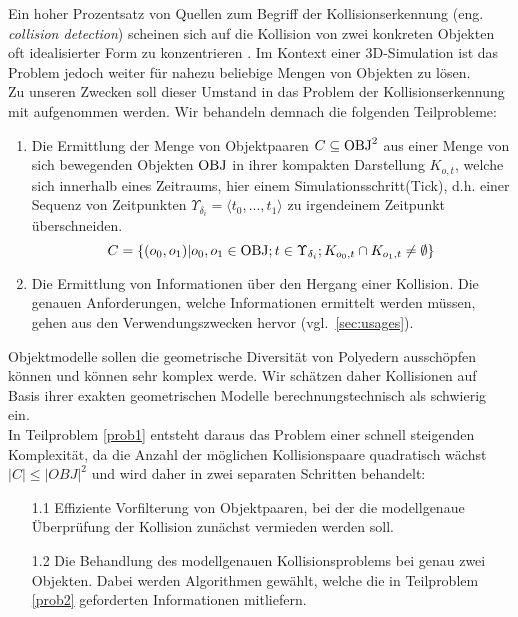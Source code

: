 \label{ref:problem_def}
Ein hoher Prozentsatz von Quellen zum Begriff der Kollisionserkennung (eng. \textit{collision detection}) scheinen sich auf die Kollision von zwei konkreten Objekten oft idealisierter Form zu konzentrieren \cites[ch.12]{fourcrossfour}{gjk}{gdc-physics}.
Im Kontext einer 3D-Simulation ist das Problem jedoch weiter für nahezu beliebige Mengen von Objekten zu lösen.\\
Zu unseren Zwecken soll dieser Umstand in das Problem der Kollisionserkennung mit aufgenommen werden. Wir behandeln demnach die folgenden Teilprobleme:
\begin{enumerate}
\item \label{prob1}Die Ermittlung der Menge von Objektpaaren $C \subseteq \operatorname{OBJ}^2$ aus einer Menge von sich bewegenden Objekten $\operatorname{OBJ}$ in ihrer kompakten Darstellung $K_{o,t}$, welche sich innerhalb eines Zeitraums, hier einem Simulationsschritt(Tick), d.h. einer Sequenz von Zeitpunkten $\Upsilon_{\delta_i} = \langle t_0 , ... , t_1 \rangle$ zu irgendeinem Zeitpunkt überschneiden.
$$C = \{(o_0, o_1) | o_0, o_1 \in \operatorname{OBJ}; t\in \Upsilon_{\delta_i}; K_{o_0, t} \cap K_{o_1, t} \neq \emptyset\}$$
\item \label{prob2}Die Ermittlung von Informationen über den Hergang einer Kollision.
Die genauen Anforderungen, welche Informationen ermittelt werden müssen, gehen aus den Verwendungszwecken hervor (vgl.~\ref{sec:usages}). 
\end{enumerate}

Objektmodelle sollen die geometrische Diversität von Polyedern ausschöpfen können und können sehr komplex werde. Wir schätzen daher Kollisionen auf Basis ihrer exakten geometrischen Modelle berechnungstechnisch als schwierig ein.\\
In Teilproblem \ref{prob1} entsteht daraus das Problem einer schnell steigenden Komplexität, da die Anzahl der möglichen Kollisionspaare quadratisch wächst $|C|\leq |OBJ|^2$ und wird daher in zwei separaten Schritten behandelt:
\begin{itemize}
\item[1.1] Effiziente Vorfilterung von Objektpaaren, bei der die modellgenaue Überprüfung der Kollision zunächst vermieden werden soll.
\item[1.2] Die Behandlung des modellgenauen Kollisionsproblems bei genau zwei Objekten. Dabei werden Algorithmen gewählt, welche die in Teilproblem \ref{prob2} geforderten Informationen mitliefern.
\end{itemize}
